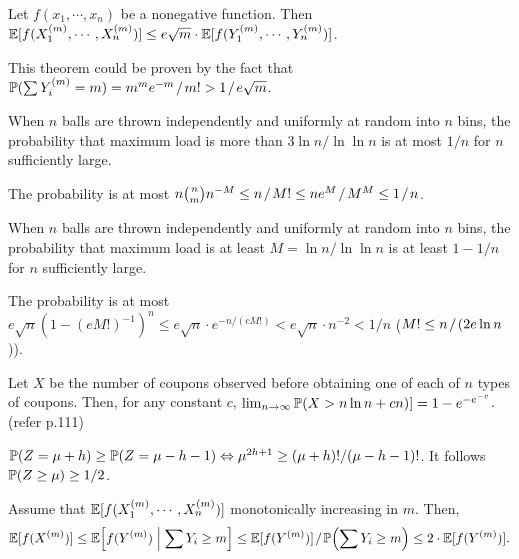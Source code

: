 \documentclass[main.tex]{subfiles}
\begin{document}
\begin{theorem}
	Let $f(x_1,\cdots,x_n)$ be a nonegative function. Then $\mathbb{E}[f(X^{(m)}_1,\cdots,X^{(m)}_n)]\le e\sqrt m\cdot\mathbb{E}[f(Y^{(m)}_1,\cdots,Y^{(m)}_n)]$.
\end{theorem}

\begin{sketch}
	This theorem could be proven by the fact that $\mathbb{P}(\sum Y^{(m)}_i=m)=m^me^{-m}\;\!/\;\! m!>1\;\!/\;\! e\sqrt{m}$.
\end{sketch}

\begin{lemma}
	When $n$ balls are thrown independently and uniformly at random into $n$ bins, the probability that maximum load is more than $3\ln n / \ln\ln n$ is at most $1/n$ for $n$ sufficiently large.
\end{lemma}

\begin{sketch}
	The probability is at most $n\binom{n}{m} n^{-M}\le n\;\!/\;\! M!\le ne^{M}\;\!/\;\! M^M\le 1\;\!/\;\!  n$.
\end{sketch}

\begin{lemma}
	When $n$ balls are thrown independently and uniformly at random into $n$ bins, the probability that maximum load is at least $M = \ln n / \ln\ln n$ is at least $1-1/n$ for $n$ sufficiently large. 
\end{lemma}

\begin{sketch}
	The probability is at most $e\sqrt{n}(1-(eM!)^{-1})^n\le e\sqrt{n}\cdot e^{-n/(eM!)}<e\sqrt{n}\cdot n^{-2}<1/n$ ($M!\le n \;\!/\;\! (2e\ln n$)).
\end{sketch}

\begin{theorem}
	Let $X$ be the number of coupons observed before obtaining one of each of $n$ types of coupons. Then, for any constant $c$, $\lim_{n\rightarrow\infty}\mathbb{P}(X>n\ln n+cn)]=1-e^{-e^{-c}}$. (refer p.111)
\end{theorem}

\bigskip

 $\mathbb{P}(Z=\mu+h)\ge\mathbb{P}(Z=\mu-h-1)\Leftrightarrow \mu^{2h+1}\ge (\mu+h)! / (\mu-h-1)!$. It follows $\mathbb{P}(Z\ge \mu)\ge 1/2$.

 Assume that $\mathbb{E}[f(X^{(m)}_1,\cdots,X^{(m)}_n)]$ monotonically increasing in $m$. Then,
\[
	\mathbb{E}[f(X^{(m)})]\le\mathbb{E}\Bigl[f(Y^{(m)}) \Bigm|  \sum Y_i\ge m\Bigr]\le \mathbb{E}[f(Y^{(m)})] \;\!/\;\! \mathbb{P}\Bigl(\sum Y_i\ge m\Bigr) \le 2 \cdot \mathbb{E}[f(Y^{(m)})].
\]
\end{document}
